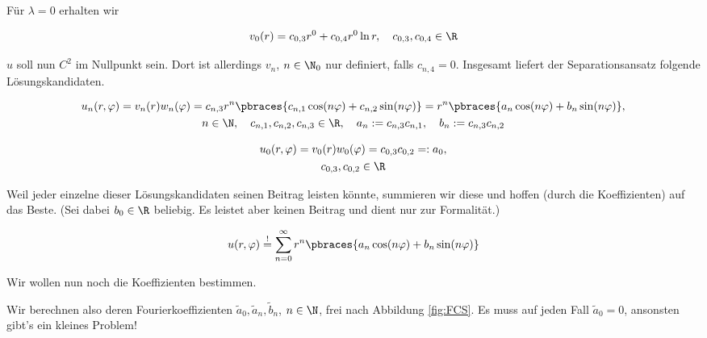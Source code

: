 \begin{solution}
\begin{enumerate}[label = (\roman*)]
    Für $\lambda = 0$ erhalten wir

    \begin{align*}
        v_0(r)
        =
        c_{0, 3} r^0 + c_{0, 4} r^0 \ln{r},
        \quad
        c_{0, 3}, c_{0, 4} \in \R
    \end{align*}

    $u$ soll nun $C^2$ im Nullpunkt sein.
    Dort ist allerdings $v_n$, $n \in \N_0$ nur definiert, falls $c_{n, 4} = 0$.
    Insgesamt liefert der Separationsansatz folgende Lösungskandidaten.

    \begin{gather*}
        u_n(r,\varphi)
        =
        v_n(r) w_n(\varphi)
        =
        c_{n, 3} r^n
        \pbraces
        {
            c_{n, 1} \cos(n \varphi)
            +
            c_{n, 2} \sin(n \varphi)
        }
        =
        r^n
        \pbraces
        {
            a_n \cos(n \varphi)
            +
            b_n \sin(n \varphi)
        }, \\
        n \in \N,
        \quad
        c_{n, 1}, c_{n, 2}, c_{n, 3} \in \R,
        \quad
        a_n := c_{n, 3} c_{n, 1},
        \quad
        b_n := c_{n, 3} c_{n, 2}
    \end{gather*}

    \begin{gather*}
        u_0(r, \varphi)
        =
        v_0(r) w_0(\varphi)
        =
        c_{0, 3}
        c_{0, 2}
        =:
        a_0, \\
        c_{0, 3}, c_{0, 2} \in \R
    \end{gather*}

    Weil jeder einzelne dieser Lösungskandidaten seinen Beitrag leisten könnte, summieren wir diese und hoffen (durch die Koeffizienten) auf das Beste.
    (Sei dabei $b_0 \in \R$ beliebig. Es leistet aber keinen Beitrag und dient nur zur Formalität.)

    \begin{align*}
        u(r, \varphi)
        \stackrel{!}{=}
        \sum_{n=0}^\infty
        r^n
        \pbraces
        {
            a_n \cos(n \varphi)
            +
            b_n \sin(n \varphi)
        }
    \end{align*}

    Wir wollen nun noch die Koeffizienten bestimmen.


    Wir berechnen also deren Fourierkoeffizienten $\tilde{a}_0, \tilde{a}_n, \tilde{b}_n$, $n \in \N$, frei nach Abbildung \ref{fig:FCS}.
    Es muss auf jeden Fall $\tilde{a}_0 = 0$, ansonsten gibt's ein kleines Problem!


\end{enumerate}
\end{solution}
